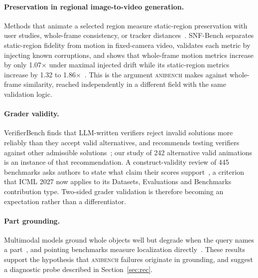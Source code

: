 \documentclass[11pt]{article}
\newcommand{\anibench}{\textsc{anibench}}
\begin{document}
\paragraph{Preservation in regional image-to-video generation.} Methods that animate a selected region measure static-region preservation with user studies, whole-frame consistency, or tracker distances~\citep{ma2024followyourclick,singer2025timetomove}. SNF-Bench separates static-region fidelity from motion in fixed-camera video, validates each metric by injecting known corruptions, and shows that whole-frame motion metrics increase by only 1.07$\times$ under maximal injected drift while its static-region metrics increase by 1.32 to 1.86$\times$~\citep{minar2026snfbench}. This is the argument \anibench{} makes against whole-frame similarity, reached independently in a different field with the same validation logic.

\paragraph{Grader validity.} VerifierBench finds that LLM-written verifiers reject invalid solutions more reliably than they accept valid alternatives, and recommends testing verifiers against other admissible solutions~\citep{yin2026verifierbench}; our study of 242 alternative valid animations is an instance of that recommendation. A construct-validity review of 445 benchmarks asks authors to state what claim their scores support~\citep{bean2025constructvalidity}, a criterion that ICML 2027 now applies to its Datasets, Evaluations and Benchmarks contribution type. Two-sided grader validation is therefore becoming an expectation rather than a differentiator.

\paragraph{Part grounding.} Multimodal models ground whole objects well but degrade when the query names a part~\citep{mehrab2026ophrg}, and pointing benchmarks measure localization directly~\citep{cheng2025pointarena}. These results support the hypothesis that \anibench{} failures originate in grounding, and suggest a diagnostic probe described in Section~\ref{sec:rec}.
\end{document}
